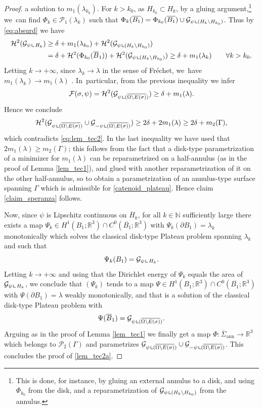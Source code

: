 \documentclass[11pt]{article}
\numberwithin{equation}{section}
\newcommand{\R}{\mathbb{R}}
\let\Om\Omega
\newcommand{\resa}{\mathop{\hbox{\vrule height 7pt width 0.5pt depth 0pt
\vrule height 0.5pt width 6pt depth 0pt}}\nolimits}
\newcommand{\resb}{\mathop{\hbox{\vrule height 4pt width 0.5pt depth 0pt
\vrule height 0.5pt width 3pt depth 0pt}}\nolimits}
\newcommand{\res}{\mathchoice{\resa}{\resa}{\resb}{\resb}}
\theoremstyle{definition}
\begin{document}
\begin{proof}
a solution to $m_1(\lambda_{k_0})$.
For $k> k_0$, as $H_{k_0}\subset H_k$, by a
gluing argument,\footnote{This is done, for instance, by gluing an external annulus to a disk, and using $\Phi_{k_0}$ from the disk, and a reparametrization of $\mathcal G_{\psi\res(H_k\setminus H_{k_0})}$ from the annulus.} we~can find $\Phi_k\in\mathcal{P}_1(\lambda_k)$ such that $\Phi_k(\overline{B_1})=\Phi_{k_0}(\overline{B_1})\cup \mathcal G_{\psi\res(H_k\setminus H_{k_0})}$. Thus by \eqref{eq:absurd} we have
\[
\begin{aligned}
\mathcal H^2( \mathcal G_{\psi\res H_{k}})
&\geq
\delta + m_1(\lambda_{k_0})
+
\mathcal H^2( \mathcal G_{\psi\res (H_k\setminus H_{k_0})})
\\
&=
\delta + \mathcal H^2(\Phi_{k_0}(\overline B_1))
+
\mathcal H^2( \mathcal G_{\psi\res (H_k\setminus H_{k_0})})
\geq
\delta+ m_1(\lambda_k)
\qquad \forall k> k_0.
\end{aligned}
\]
Letting $k\to +\infty$, since $\lambda_k\to\lambda$ in the sense of Fréchet, we~have $m_1(\lambda_k)\to m_1(\lambda)$ \cite[Th.\,4, \S 4.3]{DHS}.
In~particular, from the previous inequality we infer
\begin{equation*}
\mathcal{F}(\sigma,\psi)=\mathcal{H}^2(\mathcal G_{\psi\res(\overline{\Om\setminus E(\sigma)})})\ge\delta+m_1(\lambda).
\end{equation*}
Hence we conclude
\[
\mathcal{H}^2(\mathcal G_{\psi\res(\overline{\Om\setminus E(\sigma)})}\cup \mathcal G_{-\psi\res(\overline{\Om\setminus E(\sigma)})})\geq 2\delta+2m_1(\lambda)\geq 2\delta+m_2(\Gamma),
\]
which contradicts \eqref{eq:lem_tec2}.
In the last inequality we have used that $2m_1(\lambda)\geq m_2(\Gamma)$; this follows from the fact that a disk-type parametrization of a minimizer for $m_1(\lambda)$ can be reparametrized on a half-annulus (as in the proof of Lemma \ref{lem_tec1}), and glued with another reparametrization of it on the other half-annulus, so to obtain a parametrization of an annulus-type surface spanning $\Gamma$ which is admissible for \eqref{catenoid_plateau}.
Hence claim \eqref{claim_speranza} follows.

Now, since $\psi$ is Lipschitz continuous on $\overline H_k$, for
all $k\in \mathbb N$ sufficiently large there exists a
map $\Psi_k\in H^1(B_1;\R^3)\cap C^0(\overline {B_1};\R^3)$ with $\Psi_{k}(\partial B_1)=\lambda_{k}$ monotonically which solves the classical disk-type
Plateau problem {spanning} $\lambda_k$ and such that
\[
\Psi_k(B_1)=\mathcal G_{\psi\res H_k}.
\]
Letting $k\to +\infty$
and using that the Dirichlet energy of $\Psi_k$ equals the area of $\mathcal G_{\psi\res H_k}$, we
conclude that $(\Psi_k)$ tends to a map $\Psi\in H^1(B_1;\R^3)\cap C^0(\overline {B_1};\R^3)$
with $\Psi(\partial B_1)=\lambda$ {weakly} monotonically, and that is a solution of the classical disk-type Plateau problem with
\[
\Psi(\overline B_1)=\mathcal{G}_{\psi\res(\overline{\Om\setminus E(\sigma)})}.
\]
Arguing as in the proof of Lemma \ref{lem_tec1} we
finally get a map $\Phi:
\overline\Sigma_\mathrm{ann}\to \R^3$ which belongs to $\mathcal P_2(\Gamma)$ and parametrizes $\mathcal{G}_{\psi\res(\overline{\Om\setminus E(\sigma)})}\cup \mathcal{G}_{-\psi\res(\overline{\Om\setminus E(\sigma)})}$.
This concludes the proof of \ref{lem_tec2a}.


\end{proof}
\end{document}
